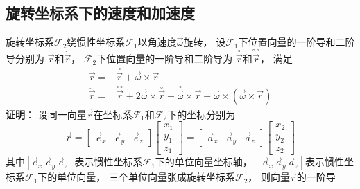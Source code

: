 \subsection{旋转坐标系下的速度和加速度}
旋转坐标系$\mathcal{F}_2$绕惯性坐标系$\mathcal{F}_1$以角速度$\vec{\omega}$旋转，
设$\mathcal{F}_1$下位置向量的一阶导和二阶导分别为
$\dot{\vec{r}}$和$\ddot{\vec{r}}$，
$\mathcal{F}_2$下位置向量的一阶导和二阶导为
$\overset{\circ}{\vec{r}}$和$\overset{\circ\circ}{\vec{r}}$，
满足
\begin{align*}
    \dot{\vec{r}}
    =& \overset{\circ}{\vec{r}}
    + \vec{\omega}\times\vec{r} \\
    \ddot{\vec{r}}
    =& \overset{\circ\circ}{\vec{r}}
    + 2\vec{\omega}\times\overset{\circ}{\vec{r}}
    + \overset{\circ}{\vec{\omega}}\times\vec{r}
    + \vec{\omega}\times(\vec{\omega}\times\vec{r})
\end{align*}
\textbf{证明}：
设同一向量$\vec{r}$在坐标系$\mathcal{F}_1$和$\mathcal{F}_2$下的坐标分别为
\begin{equation*}
    \vec{r} = \left[\begin{matrix}
        \vec{e}_x & \vec{e}_y & \vec{e}_z
    \end{matrix}\right]
    \left[\begin{matrix}
        x_1 \\ y_1 \\ z_1
    \end{matrix}\right]
    = \left[\begin{matrix}
        \vec{a}_x & \vec{a}_y & \vec{a}_z
    \end{matrix}\right]
    \left[\begin{matrix}
        x_2 \\ y_2 \\ z_2
    \end{matrix}\right]
\end{equation*}
其中$[\vec{e}_x\ \vec{e}_y\ \vec{e}_z]$表示惯性坐标系$\mathcal{F}_1$下的单位向量坐标轴，
$[\vec{a}_x\ \vec{a}_y\ \vec{a}_z]$表示惯性坐标系$\mathcal{F}_1$下的单位向量，
三个单位向量张成旋转坐标系$\mathcal{F}_2$，
则向量$\vec{r}$的一阶导
